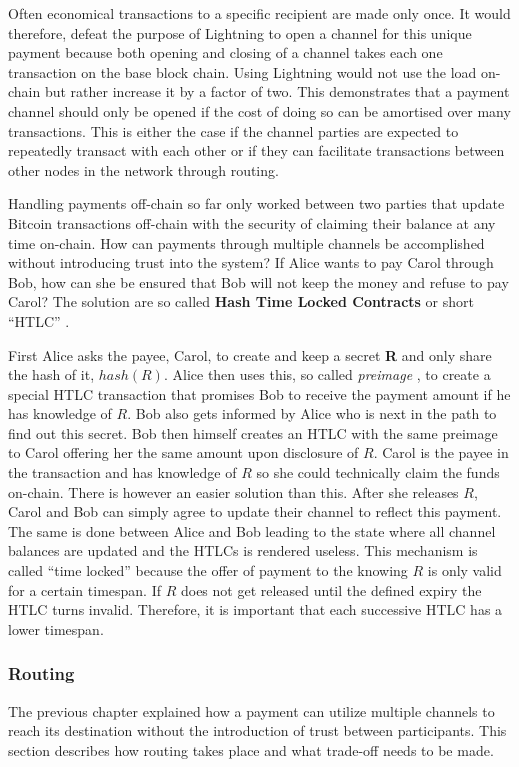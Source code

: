 \documentclass[final]{fhnwreport}       %
\begin{document}
Often economical transactions  to a specific recipient are made only once. It would therefore, defeat the purpose of Lightning to open a channel for this unique payment because both opening and closing of a channel takes each one transaction on the base block chain. Using Lightning would not use the load on-chain but rather increase it by a factor of two. This demonstrates that a payment channel should only be opened if the cost of doing so can be amortised over many transactions. This is either the case if the channel parties are expected to repeatedly transact with each other or if they can facilitate transactions between other nodes in the network through routing. 

Handling payments off-chain so far only worked between two parties that update Bitcoin transactions off-chain with the security of claiming their balance at any time on-chain. How can payments through multiple channels be accomplished without introducing trust into the system? If Alice wants to pay Carol through Bob, how can she be ensured that Bob will not keep the money and refuse to pay Carol? The solution are so called \textbf{Hash Time Locked Contracts} or short ``HTLC'' . 

First Alice asks the payee, Carol, to create and keep a secret \textbf{R} and only share the hash of it, $hash(R)$. Alice then uses this, so called \textit{preimage} , to create a special HTLC transaction that promises Bob to receive the payment amount if he has knowledge of $R$. Bob also gets informed by Alice who is next in the path to find out this secret. Bob then himself creates an HTLC with the same preimage to Carol offering her the same amount upon disclosure of $R$. Carol is the payee in the transaction and has knowledge of $R$ so she could technically claim the funds on-chain. There is however an easier solution than this. After she releases $R$, Carol and Bob can simply agree to update their channel to reflect this payment. The same is done between Alice and Bob leading to the state where all channel balances are updated and the HTLCs is rendered useless. This mechanism is called ``time locked'' because the offer of payment to the knowing $R$ is only valid for a certain timespan. If $R$ does not get released until the defined expiry the HTLC turns invalid. Therefore, it is important that each successive HTLC has a lower timespan.

\subsubsection{Routing}\label{subsec:routing}
The previous chapter explained how a payment can utilize multiple channels to reach its destination without the introduction of trust between participants. This section describes how routing takes place and what trade-off needs to be made.
\end{document}
